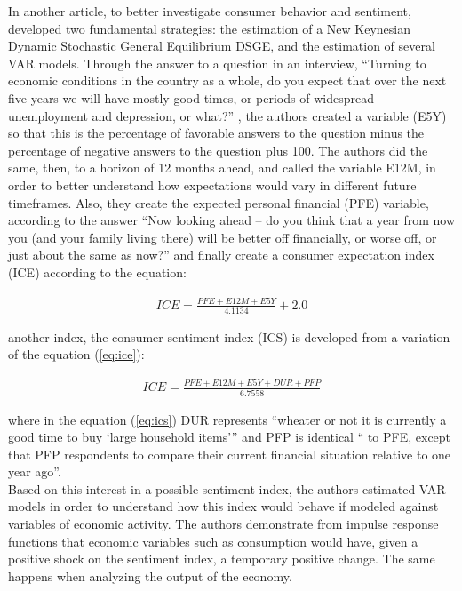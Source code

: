 In another article, to better investigate consumer behavior and sentiment, \cite{barsky2012information} developed two fundamental strategies: the estimation of a New Keynesian Dynamic Stochastic General Equilibrium DSGE, and the estimation of several VAR models. Through the answer to a question in an interview, ``Turning to economic conditions in the country as a whole, do you expect that over the next five years we will have mostly good times, or periods of widespread unemployment and depression, or what?'' \cite[p.1347]{barsky2012information}, the authors created a variable (E5Y) so that this is the percentage of favorable answers to the question minus the percentage of negative answers to the question plus 100. The authors did the same, then, to a horizon of 12 months ahead, and called the variable E12M, in order to better understand how expectations would vary in different future timeframes. Also, they create the expected personal financial (PFE) variable, according to the answer ``Now looking ahead -- do you think that a year from now you (and your family living there) will be better off financially, or worse off, or just about the same as now?'' \cite[p.1371]{barsky2012information} and finally create a consumer expectation index (ICE) according to the equation:

\begin{align} \label{eq:ice}
    ICE = \frac{PFE + E12M + E5Y}{4.1134} + 2.0
\end{align}

another index, the consumer sentiment index (ICS) is developed from a variation of the equation (\ref{eq:ice}):

\begin{align} \label{eq:ics}
    ICE = \frac{PFE + E12M + E5Y + DUR + PFP}{6.7558}
\end{align}

where in the equation (\ref{eq:ics}) DUR represents ``wheater or not it is currently a good time to buy `large household items''' \cite[p.1372]{barsky2012information} and PFP is identical `` to PFE, except that PFP respondents to compare their current financial situation relative to one year ago''\cite[p.1372]{barsky2012information}.\\

Based on this interest in a possible sentiment index, the authors estimated VAR models in order to understand how this index would behave if modeled against variables of economic activity. The authors demonstrate from impulse response functions that economic variables such as consumption would have, given a positive shock on the sentiment index, a temporary positive change. The same happens when analyzing the output of the economy.\\

